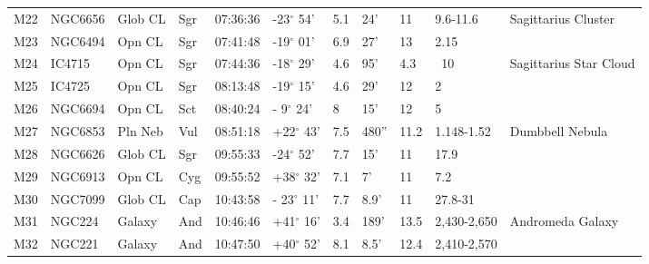 \documentclass[10pt,twoside,a4paper,english]{article}
\begin{document}
\begin{longtable}{@{}lllllllllll@{}}
M22        & NGC6656     & Glob CL    & Sgr       & 07:36:36 & -23$^{\circ}$ 54'  & 5.1       & 24'                  & 11       & 9.6-11.6            & Sagittarius Cluster                       \\ 
M23        & NGC6494     & Opn CL     & Sgr       & 07:41:48 & -19$^{\circ}$ 01'  & 6.9       & 27'                  & 13       & 2.15                &                                           \\ 
M24        & IC4715      & Opn CL     & Sgr       & 07:44:36 & -18$^{\circ}$ 29'  & 4.6       & 95'                  & 4.3      & ~10                 & Sagittarius Star Cloud                    \\ 
M25        & IC4725      & Opn CL     & Sgr       & 08:13:48 & -19$^{\circ}$ 15'  & 4.6       & 29'                  & 12       & 2                   &                                           \\ 
M26        & NGC6694     & Opn CL     & Sct       & 08:40:24 & - 9$^{\circ}$ 24'  & 8         & 15'                  & 12       & 5                   &                                           \\ 
M27        & NGC6853     & Pln Neb    & Vul       & 08:51:18 & +22$^{\circ}$ 43'  & 7.5       & 480''                & 11.2     & 1.148-1.52          & Dumbbell Nebula                           \\ 
M28        & NGC6626     & Glob CL    & Sgr       & 09:55:33 & -24$^{\circ}$ 52'  & 7.7       & 15'                  & 11       & 17.9                &                                           \\ 
M29        & NGC6913     & Opn CL     & Cyg       & 09:55:52 & +38$^{\circ}$ 32'  & 7.1       & 7'                   & 11       & 7.2                 &                                           \\ 
M30        & NGC7099     & Glob CL    & Cap       & 10:43:58 & - 23$^{\circ}$ 11' & 7.7       & 8.9'                 & 11       & 27.8-31             &                                           \\ 
M31        & NGC224      & Galaxy     & And       & 10:46:46 & +41$^{\circ}$ 16'  & 3.4       & 189'                 & 13.5     & 2,430-2,650         & Andromeda Galaxy                          \\ 
M32        & NGC221      & Galaxy     & And       & 10:47:50 & +40$^{\circ}$ 52'  & 8.1       & 8.5'                 & 12.4     & 2,410-2,570         &                                           \\ 

\end{longtable}
\end{document}
